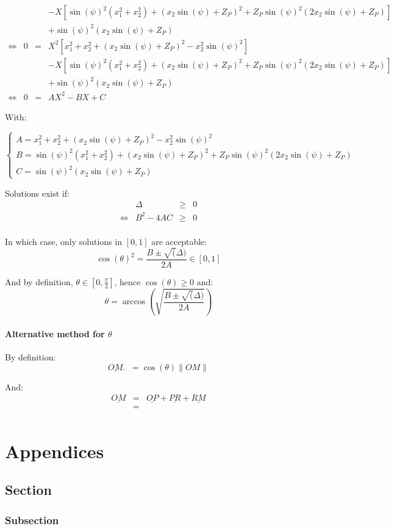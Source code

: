 \documentclass[a4paper,11pt,twoside,titlepage,openright]{book}
\numberwithin{equation}{section}
\newcommand{\lt}{\left}
\newcommand{\rt}{\right}
\DeclareMathOperator{\ez}{\underline{e}_z}
\begin{document}
$$\begin{array}{lllll}
    & & & - X\lt[ \sin(\psi)^2\lt(x_1^2+x_2^2\rt) + \lt(x_2\sin(\psi) + Z_P\rt)^2 + Z_P\sin(\psi)^2\lt(2x_2\sin(\psi) + Z_P\rt)\rt]\\
    & & & + \sin(\psi)^2\lt(x_2\sin(\psi) + Z_P\rt)\\
    \Leftrightarrow
    & 0 & = & X^2\lt[ x_1^2 + x_2^2 + \lt(x_2\sin(\psi) + Z_P\rt)^2 - x_2^2\sin(\psi)^2 \rt]\\
    & & & - X\lt[ \sin(\psi)^2\lt(x_1^2+x_2^2\rt) + \lt(x_2\sin(\psi) + Z_P\rt)^2 + Z_P\sin(\psi)^2\lt(2x_2\sin(\psi) + Z_P\rt)\rt]\\
    & & & + \sin(\psi)^2\lt(x_2\sin(\psi) + Z_P\rt)\\
    \Leftrightarrow
    & 0 & = & AX^2 - BX + C
\end{array}
$$

With:

$$
\lt\{
	\begin{array}{lll}
		A = x_1^2 + x_2^2 + \lt(x_2\sin(\psi) + Z_P\rt)^2 - x_2^2\sin(\psi)^2\\
		B = \sin(\psi)^2\lt(x_1^2+x_2^2\rt) + \lt(x_2\sin(\psi) + Z_P\rt)^2 + Z_P\sin(\psi)^2\lt(2x_2\sin(\psi) + Z_P\rt)\\
		C = \sin(\psi)^2\lt(x_2\sin(\psi) + Z_P\rt)
	\end{array}
\rt.
$$

Solutions exist if:
$$
\begin{array}{lllll}
    & \Delta & \geq & 0\\
    \Leftrightarrow
    & B^2 - 4AC & \geq & 0\\
\end{array}
$$

In which case, only solutions in $\lt[0,1\rt]$ are acceptable:
$$
\cos(\theta)^2 = \frac{B \pm \sqrt(\Delta)}{2A} \in \lt[0,1\rt]
$$

And by definition, $\theta \in \lt[0,\frac{\pi}{2}\rt]$, hence $\cos(\theta)\geq0$ and:
$$
\theta = \arccos\lt(\sqrt{\frac{B \pm \sqrt(\Delta)}{2A}}\rt)
$$

\subsubsection{Alternative method for $\theta$}

By definition:
$$
\underline{OM}.\ez = \cos(\theta)\|OM\|
$$

And:
$$
\begin{array}{lllll}
	\underline{OM} 	& = & \underline{OP} + \underline{PR} + \underline{RM}\\
			& = & \\
\end{array}
$$





\appendix
\chapter{Appendices}

\section{Section}
\subsection{Subsection}
\end{document}
